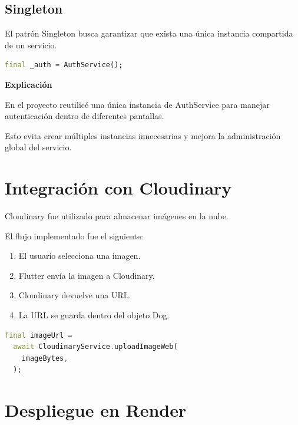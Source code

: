 \documentclass[12pt]{article}
\begin{document}
\subsection{Singleton}

El patrón Singleton busca garantizar que exista una única instancia compartida de un servicio.

\begin{lstlisting}[language=Dart]
final _auth = AuthService();
\end{lstlisting}

\textbf{Explicación}

En el proyecto reutilicé una única instancia de AuthService para manejar autenticación dentro de diferentes pantallas.

Esto evita crear múltiples instancias innecesarias y mejora la administración global del servicio.


\section{Integración con Cloudinary}

Cloudinary fue utilizado para almacenar imágenes en la nube.

El flujo implementado fue el siguiente:

\begin{enumerate}
    \item El usuario selecciona una imagen.
    \item Flutter envía la imagen a Cloudinary.
    \item Cloudinary devuelve una URL.
    \item La URL se guarda dentro del objeto Dog.
\end{enumerate}

\begin{lstlisting}[language=Dart]
final imageUrl =
  await CloudinaryService.uploadImageWeb(
    imageBytes,
  );
\end{lstlisting}


\section{Despliegue en Render}
\end{document}
